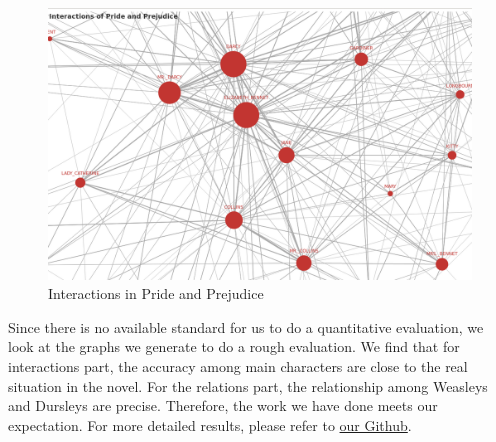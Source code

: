 \documentclass[11pt]{article}
\begin{document}
    \begin{figure}[H]
        \centering
        \includegraphics[width=\linewidth]{images/int_pap.png}
        \caption{Interactions in Pride and Prejudice}
    \end{figure}
    Since there is no available standard for us to do a quantitative evaluation, we look at the graphs we generate to do a rough evaluation. We find that for interactions part, the accuracy among main characters are close to the real situation in the novel. For the relations part, the relationship among Weasleys and Dursleys are precise. Therefore, the work we have done meets our expectation. For more detailed results, please refer to \href{https://weixiangyu14.github.io/}{our Github}.
\end{document}
